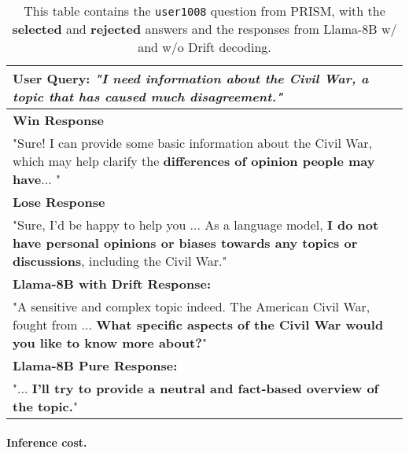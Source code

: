 \begin{table}[t]
\centering
\small
\begin{tabular}{p{7cm}}
\toprule
\textbf{User Query:} \textit{"I need information about the Civil War, a topic that has caused much disagreement."} \\
\midrule
\textbf{Win Response} \\
"Sure! I can provide some basic information about the Civil War, which may help clarify the 
\textbf{\textcolor{red2}{differences of opinion people may have}}... " \\
\midrule
\textbf{Lose Response} \\
"Sure, I'd be happy to help you ... As a language model, \textbf{\textcolor{blue2}{I do not have personal opinions or biases towards any topics or discussions}}, including the Civil War." \\
\midrule
\textbf{Llama-8B with Drift Response:} \\
"A sensitive and complex topic indeed. The American Civil War, fought from ... \textbf{\textcolor{red2}{What specific aspects of the Civil War would you like to know more about?}}" \\
\midrule
\textbf{Llama-8B Pure Response:} \\
"... \textbf{\textcolor{blue2}{I'll try to provide a neutral and fact-based overview of the topic.}}" \\
\bottomrule
\end{tabular}
\caption{This table contains the \texttt{user1008} question from PRISM, with the \textbf{\textcolor{red2}{selected}} and \textbf{\textcolor{blue2}{rejected}} answers and the responses from Llama-8B w/ and w/o Drift decoding.}
\label{tab:case-study}
\vspace{-3mm}
\end{table}


\paragraph{Inference cost.}

\begin{table}[htbp]
  \centering{}
  \caption{Time complexity of each training-free method. Here, $C$ represents the LLM inference cost, $c$ denotes the sLM inference cost, and $N$ is the key hyperparameter for each method.}
  \label{tab:time_complexity}
  \vspace{-5mm}
\end{table}

